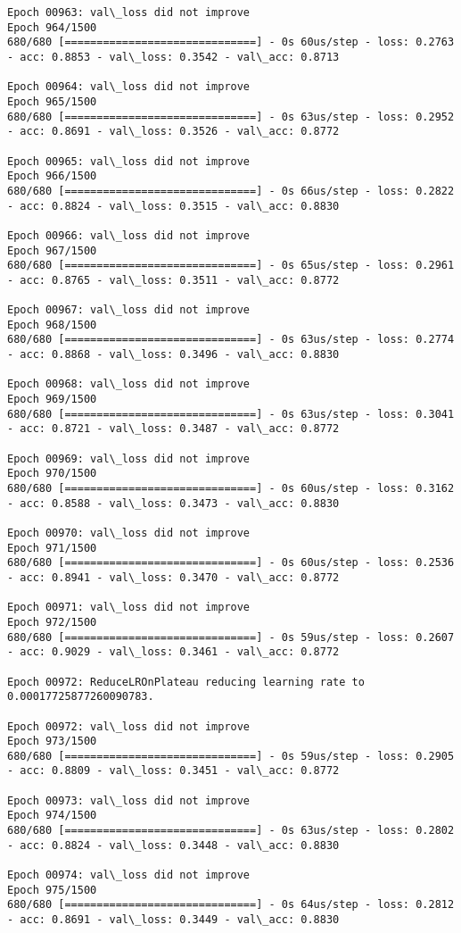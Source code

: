 \documentclass[11pt]{article}
\begin{document}
\begin{Verbatim}[commandchars=\\\{\}]
Epoch 00963: val\_loss did not improve
Epoch 964/1500
680/680 [==============================] - 0s 60us/step - loss: 0.2763 - acc: 0.8853 - val\_loss: 0.3542 - val\_acc: 0.8713

Epoch 00964: val\_loss did not improve
Epoch 965/1500
680/680 [==============================] - 0s 63us/step - loss: 0.2952 - acc: 0.8691 - val\_loss: 0.3526 - val\_acc: 0.8772

Epoch 00965: val\_loss did not improve
Epoch 966/1500
680/680 [==============================] - 0s 66us/step - loss: 0.2822 - acc: 0.8824 - val\_loss: 0.3515 - val\_acc: 0.8830

Epoch 00966: val\_loss did not improve
Epoch 967/1500
680/680 [==============================] - 0s 65us/step - loss: 0.2961 - acc: 0.8765 - val\_loss: 0.3511 - val\_acc: 0.8772

Epoch 00967: val\_loss did not improve
Epoch 968/1500
680/680 [==============================] - 0s 63us/step - loss: 0.2774 - acc: 0.8868 - val\_loss: 0.3496 - val\_acc: 0.8830

Epoch 00968: val\_loss did not improve
Epoch 969/1500
680/680 [==============================] - 0s 63us/step - loss: 0.3041 - acc: 0.8721 - val\_loss: 0.3487 - val\_acc: 0.8772

Epoch 00969: val\_loss did not improve
Epoch 970/1500
680/680 [==============================] - 0s 60us/step - loss: 0.3162 - acc: 0.8588 - val\_loss: 0.3473 - val\_acc: 0.8830

Epoch 00970: val\_loss did not improve
Epoch 971/1500
680/680 [==============================] - 0s 60us/step - loss: 0.2536 - acc: 0.8941 - val\_loss: 0.3470 - val\_acc: 0.8772

Epoch 00971: val\_loss did not improve
Epoch 972/1500
680/680 [==============================] - 0s 59us/step - loss: 0.2607 - acc: 0.9029 - val\_loss: 0.3461 - val\_acc: 0.8772

Epoch 00972: ReduceLROnPlateau reducing learning rate to 0.00017725877260090783.

Epoch 00972: val\_loss did not improve
Epoch 973/1500
680/680 [==============================] - 0s 59us/step - loss: 0.2905 - acc: 0.8809 - val\_loss: 0.3451 - val\_acc: 0.8772

Epoch 00973: val\_loss did not improve
Epoch 974/1500
680/680 [==============================] - 0s 63us/step - loss: 0.2802 - acc: 0.8824 - val\_loss: 0.3448 - val\_acc: 0.8830

Epoch 00974: val\_loss did not improve
Epoch 975/1500
680/680 [==============================] - 0s 64us/step - loss: 0.2812 - acc: 0.8691 - val\_loss: 0.3449 - val\_acc: 0.8830


\end{Verbatim}
\end{document}
